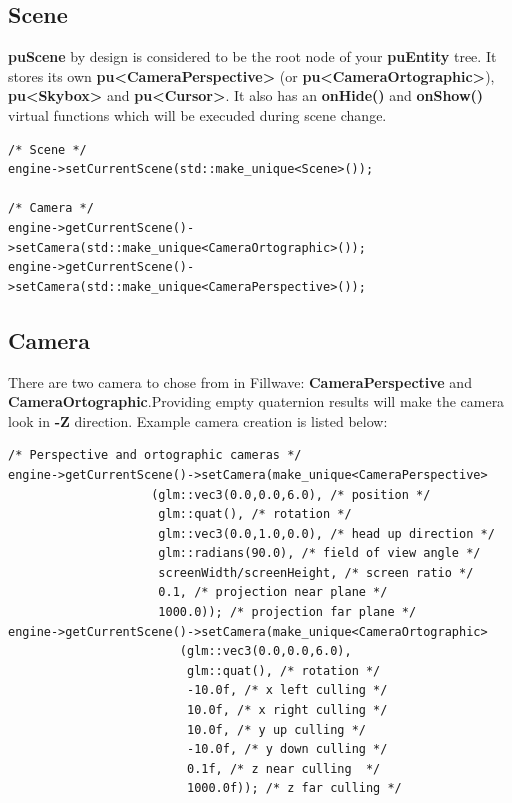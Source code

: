 \documentclass{article}
\begin{document}
\subsection{Scene}\label{sec:Scene}
\indent \indent \textbf{puScene} by design is considered to be the root node of your \textbf{puEntity} tree. It stores its own \textbf{pu<CameraPerspective>} (or \textbf{pu<CameraOrtographic>}), \textbf{pu<Skybox>} and \textbf{pu<Cursor>}. It also has an \textbf{onHide()} and \textbf{onShow()} virtual functions which will be execuded during scene change.

\begin{lstlisting}
/* Scene */
engine->setCurrentScene(std::make_unique<Scene>());

/* Camera */
engine->getCurrentScene()->setCamera(std::make_unique<CameraOrtographic>());
engine->getCurrentScene()->setCamera(std::make_unique<CameraPerspective>());
\end{lstlisting}

\subsection{Camera}\label{sec:Camera}

\indent \indent There are two camera to chose from in Fillwave: \textbf{CameraPerspective} and \textbf{CameraOrtographic}.Providing empty quaternion results will make the camera look in \textbf{-Z} direction. Example camera creation is listed below:

\begin{lstlisting}
/* Perspective and ortographic cameras */
engine->getCurrentScene()->setCamera(make_unique<CameraPerspective>
                    (glm::vec3(0.0,0.0,6.0), /* position */
                     glm::quat(), /* rotation */                
                     glm::vec3(0.0,1.0,0.0), /* head up direction */         
                     glm::radians(90.0), /* field of view angle */        
                     screenWidth/screenHeight, /* screen ratio */
                     0.1, /* projection near plane */
                     1000.0)); /* projection far plane */
engine->getCurrentScene()->setCamera(make_unique<CameraOrtographic>
                        (glm::vec3(0.0,0.0,6.0),
                         glm::quat(), /* rotation */                
                         -10.0f, /* x left culling */
                         10.0f, /* x right culling */
                         10.0f, /* y up culling */
                         -10.0f, /* y down culling */
                         0.1f, /* z near culling  */
                         1000.0f)); /* z far culling */
\end{lstlisting}
\end{document}
